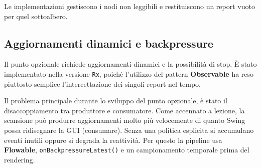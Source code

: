 Le implementazioni gestiscono i nodi non leggibili e restituiscono un report vuoto per quel sottoalbero.

\subsection{Aggiornamenti dinamici e backpressure}
Il punto opzionale richiede aggiornamenti dinamici e la possibilità di stop. È stato implementato nella versione \texttt{Rx}, poichè l'utilizzo del pattern \textbf{Observable} ha reso piuttosto semplice l'intercettazione dei singoli report nel tempo.

Il problema principale durante lo sviluppo del punto opzionale, è stato il disaccoppiamento tra produttore e consumatore.
Come accennato a lezione, la scansione può produrre aggiornamenti molto più velocemente di quanto Swing possa ridisegnare la GUI (consumare). Senza una politica esplicita si accumulano eventi inutili oppure si degrada la reattività. Per questo la pipeline usa \textbf{Flowable}, \texttt{onBackpressureLatest()} e un campionamento temporale prima del rendering.